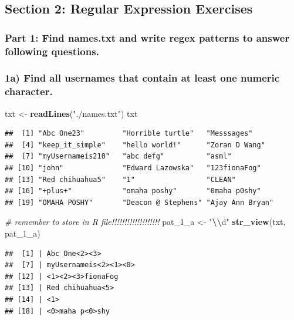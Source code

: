 \documentclass[
]{article}
\newenvironment{Shaded}{\begin{snugshade}}{\end{snugshade}}
\newcommand{\CommentTok}[1]{\textcolor[rgb]{0.56,0.35,0.01}{\textit{#1}}}
\newcommand{\FunctionTok}[1]{\textcolor[rgb]{0.13,0.29,0.53}{\textbf{#1}}}
\newcommand{\NormalTok}[1]{#1}
\newcommand{\OtherTok}[1]{\textcolor[rgb]{0.56,0.35,0.01}{#1}}
\newcommand{\SpecialCharTok}[1]{\textcolor[rgb]{0.81,0.36,0.00}{\textbf{#1}}}
\newcommand{\StringTok}[1]{\textcolor[rgb]{0.31,0.60,0.02}{#1}}
\begin{document}
\subsection{Section 2: Regular Expression
Exercises}\label{section-2-regular-expression-exercises}

\subsubsection{Part 1: Find names.txt and write regex patterns to answer
following
questions.}\label{part-1-find-names.txt-and-write-regex-patterns-to-answer-following-questions.}

\subsubsection{1a) Find all usernames that contain at least one numeric
character.}\label{a-find-all-usernames-that-contain-at-least-one-numeric-character.}

\begin{Shaded}
\begin{Highlighting}[]
\NormalTok{txt }\OtherTok{\textless{}{-}} \FunctionTok{readLines}\NormalTok{(}\StringTok{"./names.txt"}\NormalTok{)}
\NormalTok{txt}
\end{Highlighting}
\end{Shaded}

\begin{verbatim}
##  [1] "Abc One23"         "Horrible turtle"   "Messsages"        
##  [4] "keep_it_simple"    "hello world!"      "Zoran D Wang"     
##  [7] "myUsernameis210"   "abc defg"          "asml"             
## [10] "john"              "Edward Lazowska"   "123fionaFog"      
## [13] "Red chihuahua5"    "1"                 "CLEAN"            
## [16] "+plus+"            "omaha poshy"       "0maha p0shy"      
## [19] "OMAHA POSHY"       "Deacon @ Stephens" "Ajay Ann Bryan"
\end{verbatim}

\begin{Shaded}
\begin{Highlighting}[]
\CommentTok{\# remember to store in R file!!!!!!!!!!!!!!!!!!!}
\NormalTok{pat\_1\_a }\OtherTok{\textless{}{-}} \StringTok{"}\SpecialCharTok{\textbackslash{}\textbackslash{}}\StringTok{d"}
\FunctionTok{str\_view}\NormalTok{(txt, pat\_1\_a)}
\end{Highlighting}
\end{Shaded}

\begin{verbatim}
##  [1] | Abc One<2><3>
##  [7] | myUsernameis<2><1><0>
## [12] | <1><2><3>fionaFog
## [13] | Red chihuahua<5>
## [14] | <1>
## [18] | <0>maha p<0>shy
\end{verbatim}
\end{document}
